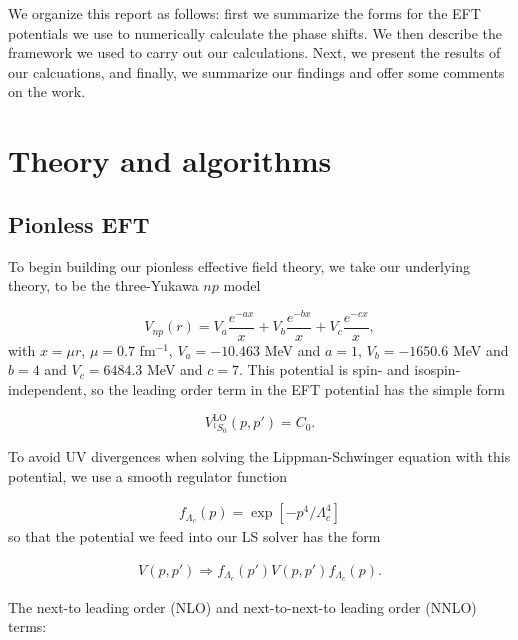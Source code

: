 \documentclass[10pt,showpacs,preprintnumbers,footinbib,amsmath,amssymb,aps,prl,twocolumn,groupedaddress,superscriptaddress,showkeys]{revtex4-1}
\begin{document}
We organize this report as follows: first we summarize the forms for the EFT potentials we
use to numerically calculate the phase shifts. We then describe the framework we used to
carry out our calculations. Next, we present the results of our calcuations, and finally, we
summarize our findings and offer some comments on the work.



\section{Theory and algorithms}\label{sec:theory}

\subsection{Pionless EFT}

To begin building our pionless effective field theory, we take our underlying theory, to be
the three-Yukawa $np$ model

\begin{equation}
	V _{np}(r)=V_a \frac{e^{-ax}}{x}+V_b \frac{e^{-bx}}{x}+V_c \frac{e^{-cx}}{x},
	\label{eq:NPpot}
\end{equation}
with $x=\mu r$, $\mu=0.7$ fm$^{-1}$,
$V_a=-10.463$ MeV and $a=1$, $V_b=-1650.6$ MeV and $b=4$ and
$V_c=6484.3$ MeV and $c=7$.
This potential is spin- and isospin-independent, so the leading order term in the EFT potential
has the simple form

\begin{equation*}
	V^\mathrm{LO}_{^1S_0}(p,p')=C_0.
\end{equation*}

To avoid UV divergences when solving the Lippman-Schwinger equation with this potential,
we use a smooth regulator function

\begin{equation*}
\begin{split}
	f_{\Lambda_c}(p) = \exp{[-p^4/\Lambda_c^4]}
\end{split}
\end{equation*}
so that the potential we feed into our LS solver has the form


\begin{equation*}
\begin{split}
	V(p,p')\Rightarrow f_{\Lambda_c}(p')V(p,p')f_{\Lambda_c}(p).
\end{split}
\end{equation*} 

The next-to leading order (NLO) and next-to-next-to leading order (NNLO) terms:
\end{document}
